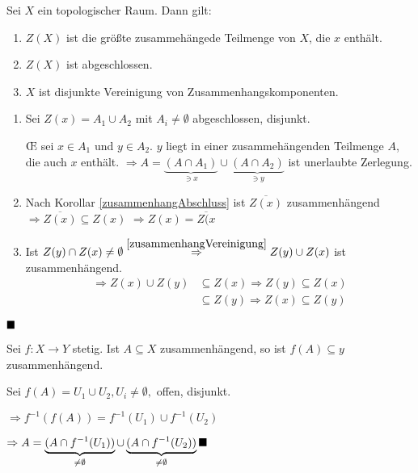 \begin{korollar}
    Sei $X$ ein topologischer Raum. Dann gilt:
    \begin{enumerate}[label=\alph*)]
        \item $Z(X)$ ist die größte zusammehängede Teilmenge von $X$,
              die $x$ enthält.
        \item $Z(X)$ ist abgeschlossen.
        \item $X$ ist disjunkte Vereinigung von Zusammenhangskomponenten.
    \end{enumerate}
\end{korollar}

\begin{beweis}
    \begin{enumerate}[label=\alph*)]
        \item Sei $Z(x) = A_1 \cup A_2$ mit $A_i \neq \emptyset$ abgeschlossen,
              disjunkt.

            \OE{} sei $x \in A_1$ und $y \in A_2$. $y$ liegt in einer zusammehängenden
            Teilmenge $A$, die auch $x$ enthält.
            $\Rightarrow A = \underbrace{(A \cap A_1)}_{\ni x} \cup \underbrace{(A \cap A_2)}_{\ni y}$
            ist unerlaubte Zerlegung.
        \item Nach Korollar \ref{zusammenhangAbschluss} ist $\overline{Z(x)}$
              zusammenhängend $\Rightarrow \overline{Z(x)} \subseteq Z(x)$
              $\Rightarrow Z(x) = \overline{Z(x}$
        \item Ist $Z(y) \cap Z(x) \neq \emptyset \stackrel{\ref{zusammenhangVereinigung}}{\Rightarrow} Z(y) \cup Z(x)$
              ist zusammenhängend. \\
              \begin{align*}
                \Rightarrow Z(x) \cup Z(y) &\subseteq Z(x) \Rightarrow Z(y) \subseteq Z(x)\\
                                           &\subseteq Z(y) \Rightarrow Z(x) \subseteq Z(y)
              \end{align*} 
    \end{enumerate}

    $\qed$
\end{beweis}

\begin{korollar}
    Sei $f:X \rightarrow Y$ stetig. Ist $A \subseteq X$ zusammenhängend,
    so ist $f(A) \subseteq y$ zusammenhängend.
\end{korollar}

\begin{beweis}
    Sei $f(A) = U_1 \cup U_2, U_i \neq \emptyset,$ offen, disjunkt.

    $\Rightarrow f^{-1} (f(A)) = f^{-1}(U_1) \cup f^{-1}(U_2)$

    $\Rightarrow A = \underbrace{(A \cap f^{-1}(U_1))}_{\neq \emptyset} \cup \underbrace{(A \cap f^{-1}(U_2))}_{\neq \emptyset} \qed$
\end{beweis}

